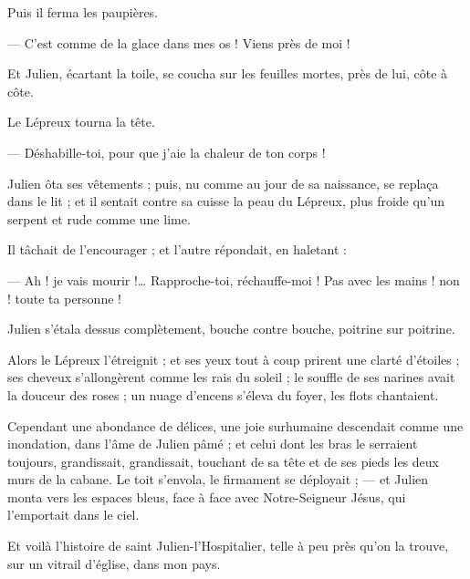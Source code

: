 \documentclass[]{book}
\begin{document}
                Puis il ferma les paupières.
                    
                — C'est comme de la glace dans mes os ! Viens près de moi !
                    
                Et Julien, écartant la toile, se coucha sur les feuilles mortes, près de lui, côte à côte.
                    
                Le Lépreux tourna la tête.
                    
                — Déshabille-toi, pour que j'aie la chaleur de ton corps !
                    
                Julien ôta ses vêtements ; puis, nu comme au jour de sa naissance, se replaça dans le lit ; et il sentait contre sa cuisse la peau du Lépreux, plus froide qu'un serpent et rude comme une lime.
                    
                Il tâchait de l'encourager ; et l'autre répondait, en haletant :
                    
                — Ah ! je vais mourir !… Rapproche-toi, réchauffe-moi ! Pas avec les mains ! non ! toute ta personne !
                    
                Julien s'étala dessus complètement, bouche contre bouche, poitrine sur poitrine.
                    
                Alors le Lépreux l'étreignit ; et ses yeux tout à coup prirent une clarté d'étoiles ; ses cheveux s'allongèrent comme les rais du soleil ; le souffle de ses narines avait la douceur des roses ; un nuage d'encens s'éleva du foyer, les flots chantaient.
                    
                Cependant une abondance de délices, une joie surhumaine descendait comme une inondation, dans l'âme de Julien pâmé ; et celui dont les bras le serraient toujours, grandissait, grandissait, touchant de sa tête et de ses pieds les deux murs de la cabane. Le toit s'envola, le firmament se déployait ; — et Julien monta vers les espaces bleus, face à face avec Notre-Seigneur Jésus, qui l'emportait dans le ciel.
                    
                Et voilà l'histoire de saint Julien-l'Hospitalier, telle à peu près qu'on la trouve, sur un vitrail d'église, dans mon pays. 
                    
                
            
            \printindex[indiv]
            \printindex[lieux]
            
            \tableofcontents
            
            
\end{document}
